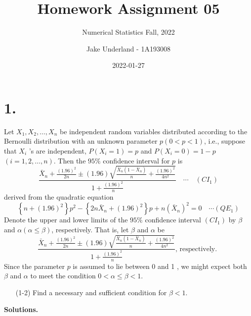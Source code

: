 \documentclass[
]{article}
\title{Homework Assignment 05}
\subtitle{Numerical Statistics Fall, 2022}
\author{Jake Underland - 1A193008}
\date{2022-01-27}
\begin{document}
\maketitle

\hypertarget{section}{%
\section{1.}\label{section}}

Let \(X_{1}, X_{2}, \ldots, X_{n}\) be independent random variables
distributed according to the Bernoulli distribution with an unknown
parameter \(p(0<p<1)\), i.e., suppose that \(X_{i}\) 's are independent,
\(P\left(X_{i}=1\right)=p\) and \(P\left(X_{i}=0\right)=1-p\)
\((i=1,2, \ldots, n)\). Then the \(95 \%\) confidence interval for \(p\)
is \[
\frac{\bar{X}_{n}+\frac{(1.96)^{2}}{2 n} \pm(1.96) \sqrt{\frac{\bar{X}_{n}\left(1-\bar{X}_{n}\right)}{n}+\frac{(1.96)^{2}}{4 n^{2}}}}{1+\frac{(1.96)^{2}}{n}} \quad \cdots \quad\left(C I_{1}\right)
\] derived from the quadratic equation \[
\left\{n+(1.96)^{2}\right\} p^{2}-\left\{2 n \bar{X}_{n}+(1.96)^{2}\right\} p+n\left(\bar{X}_{n}\right)^{2}=0 \quad \cdots\left(Q E_{1}\right)
\] Denote the upper and lower limits of the \(95 \%\) confidence
interval \(\left(C I_{1}\right)\) by \(\beta\) and
\(\alpha(\alpha \leq \beta)\), respectively. That is, let \(\beta\) and
\(\alpha\) be \[
\frac{\bar{X}_{n}+\frac{(1.96)^{2}}{2 n} \pm(1.96) \sqrt{\frac{\bar{X}_{n}\left(1-\bar{X}_{n}\right)}{n}+\frac{(1.96)^{2}}{4 n^{2}}}}{1+\frac{(1.96)^{2}}{n}} \text {, respectively. }
\] Since the parameter \(p\) is assumed to lie between 0 and 1 , we
might expect both \(\beta\) and \(\alpha\) to meet the condition
\(0<\alpha \leq \beta<1\).

\begin{itemize}
\item[(1-2)] Find a necessary and sufficient condition for $\beta<1$.
\end{itemize}

\textbf{Solutions.}
\end{document}
